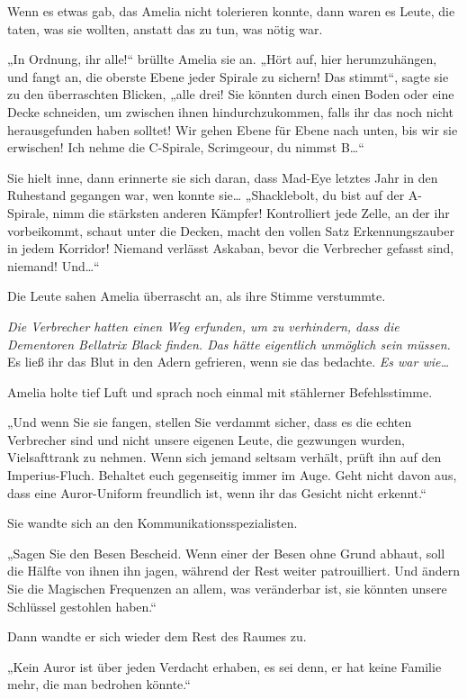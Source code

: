 {Wenn es etwas gab, das Amelia nicht tolerieren konnte, dann waren es Leute, die taten, was sie wollten, anstatt das zu tun, was nötig war.

„In Ordnung, ihr alle!“ brüllte Amelia sie an. „Hört auf, hier herumzuhängen, und fangt an, die oberste Ebene jeder Spirale zu sichern! Das stimmt“, sagte sie zu den überraschten Blicken, „alle drei! Sie könnten durch einen Boden oder eine Decke schneiden, um zwischen ihnen hindurchzukommen, falls ihr das noch nicht herausgefunden haben solltet! Wir gehen Ebene für Ebene nach unten, bis wir sie erwischen! Ich nehme die C-Spirale, Scrimgeour, du nimmst B…“

Sie hielt inne, dann erinnerte sie sich daran, dass Mad-Eye letztes Jahr in den Ruhestand gegangen war, wen konnte sie… „Shacklebolt, du bist auf der A-Spirale, nimm die stärksten anderen Kämpfer! Kontrolliert jede Zelle, an der ihr vorbeikommt, schaut unter die Decken, macht den vollen Satz Erkennungszauber in jedem Korridor! Niemand verlässt Askaban, bevor die Verbrecher gefasst sind, niemand! Und…“

Die Leute sahen Amelia überrascht an, als ihre Stimme verstummte.

\emph{Die Verbrecher hatten einen Weg erfunden, um zu verhindern, dass die Dementoren Bellatrix Black finden. Das hätte eigentlich unmöglich sein müssen.} Es ließ ihr das Blut in den Adern gefrieren, wenn sie das bedachte. \emph{Es war wie…}

Amelia holte tief Luft und sprach noch einmal mit stählerner Befehlsstimme.

„Und wenn Sie sie fangen, stellen Sie verdammt sicher, dass es die echten Verbrecher sind und nicht unsere eigenen Leute, die gezwungen wurden, Vielsafttrank zu nehmen. Wenn sich jemand seltsam verhält, prüft ihn auf den Imperius-Fluch. Behaltet euch gegenseitig immer im Auge. Geht nicht davon aus, dass eine Auror-Uniform freundlich ist, wenn ihr das Gesicht nicht erkennt.“

Sie wandte sich an den Kommunikationsspezialisten.

„Sagen Sie den Besen Bescheid. Wenn einer der Besen ohne Grund abhaut, soll die Hälfte von ihnen ihn jagen, während der Rest weiter patrouilliert. Und ändern Sie die Magischen Frequenzen an allem, was veränderbar ist, sie könnten unsere Schlüssel gestohlen haben.“

Dann wandte er sich wieder dem Rest des Raumes zu.

„Kein Auror ist über jeden Verdacht erhaben, es sei denn, er hat keine Familie mehr, die man bedrohen könnte.“

}
